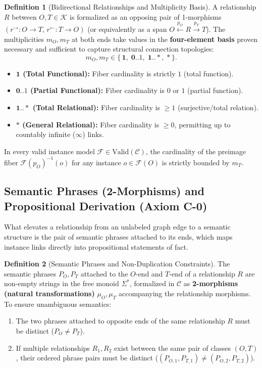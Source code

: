 \documentclass[11pt,a4paper]{article}
\theoremstyle{definition}
\newtheorem{definition}{Definition}[section]
\theoremstyle{plain}
\theoremstyle{remark}
\newcommand{\Valid}{\mathrm{Valid}}
\begin{document}
\begin{definition}[Bidirectional Relationships and Multiplicity Basis]\label{def:relationship}
A relationship $R$ between $O, T \in \mathcal{K}$ is formalized as an opposing pair of 1-morphisms $(r^{\rightarrow} : O \to T,\, r^{\leftarrow} : T \to O)$ (or equivalently as a span $O \xleftarrow{p_O} R \xrightarrow{p_T} T$). The multiplicities $m_O, m_T$ at both ends take values in the \textbf{four-element basis} proven necessary and sufficient to capture structural connection topologies:
\begin{equation}
m_O, m_T \in \{\, \mathbf{1},\; \mathbf{0..1},\; \mathbf{1..*},\; \mathbf{*} \,\}.
\end{equation}
\begin{itemize}
    \item \textbf{$\mathbf{1}$ (Total Functional):} Fiber cardinality is strictly $1$ (total function).
    \item \textbf{$\mathbf{0..1}$ (Partial Functional):} Fiber cardinality is $0$ or $1$ (partial function).
    \item \textbf{$\mathbf{1..*}$ (Total Relational):} Fiber cardinality is $\ge 1$ (surjective/total relation).
    \item \textbf{$\mathbf{*}$ (General Relational):} Fiber cardinality is $\ge 0$, permitting up to countably infinite ($\infty$) links.
\end{itemize}
\end{definition}

In every valid instance model $\mathcal{F} \in \Valid(\mathcal{C})$, the cardinality of the preimage fiber $\mathcal{F}(p_O)^{-1}(o)$ for any instance $o \in \mathcal{F}(O)$ is strictly bounded by $m_T$.

\subsection{Semantic Phrases (2-Morphisms) and Propositional Derivation (Axiom C-0)}
What elevates a relationship from an unlabeled graph edge to a semantic structure is the pair of semantic phrases attached to its ends, which maps instance links directly into propositional statements of fact.

\begin{definition}[Semantic Phrases and Non-Duplication Constraints]\label{def:phrases}
The semantic phrases $P_O, P_T$ attached to the $O$-end and $T$-end of a relationship $R$ are non-empty strings in the free monoid $\Sigma^*$, formalized in $\mathcal{C}$ as \textbf{2-morphisms (natural transformations)} $\mu_O, \mu_T$ accompanying the relationship morphisms. To ensure unambiguous semantics:
\begin{enumerate}

        \item The two phrases attached to opposite ends of the same relationship $R$ must be distinct ($P_O \neq P_T$).
    \item If multiple relationships $R_1, R_2$ exist between the same pair of classes $(O, T)$, their ordered phrase pairs must be distinct ($(P_{O,1}, P_{T,1}) \neq (P_{O,2}, P_{T,2})$).
\end{enumerate}
\end{definition}
\end{document}
